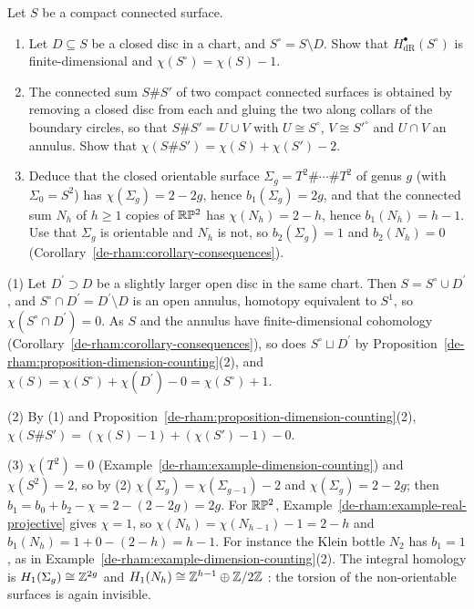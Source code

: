 \begin{exercise}\label{de-rham:exercise-genus-betti}
Let $S$ be a compact connected surface.
\begin{enumerate}
\item Let $D \subseteq S$ be a closed disc in a chart, and $S^\circ = S \setminus D$. Show that $H^\bullet_{\mathrm{dR}}(S^\circ)$ is finite-dimensional and $\chi(S^\circ) = \chi(S) - 1$.
\item The connected sum $S \# S'$ of two compact connected surfaces is obtained by removing a closed disc from each and gluing the two along collars of the boundary circles, so that $S \# S' = U \cup V$ with
$U \cong S^\circ$, $V \cong S'^\circ$ and $U \cap V$ an annulus. Show that $\chi(S \# S') = \chi(S) + \chi(S') - 2$.
\item Deduce that the closed orientable surface $\Sigma_g = T^2 \# \cdots \# T^2$ of genus $g$ (with $\Sigma_0 = S^2$) has $\chi(\Sigma_g) = 2 - 2g$, hence $b_1(\Sigma_g) = 2g$, and that the connected sum $N_h$ of
$h \geq 1$ copies of $\mathbb{R}\mathbb{P}^2$ has $\chi(N_h) = 2 - h$, hence $b_1(N_h) = h - 1$. Use that $\Sigma_g$ is orientable and $N_h$ is not, so $b_2(\Sigma_g) = 1$ and $b_2(N_h) = 0$
(Corollary~\ref{de-rham:corollary-consequences}).
\end{enumerate}
\end{exercise}

\begin{solution}
(1) Let $D^\prime \supset D$ be a slightly larger open disc in the same chart. Then $S = S^\circ \cup D^\prime$, and $S^\circ \cap D^\prime = D^\prime \setminus D$ is an open annulus, homotopy equivalent to $S^1$, so
$\chi(S^\circ \cap D^\prime) = 0$. As $S$ and the annulus have finite-dimensional cohomology (Corollary~\ref{de-rham:corollary-consequences}), so does $S^\circ \sqcup D^\prime$ by
Proposition~\ref{de-rham:proposition-dimension-counting}(2), and $\chi(S) = \chi(S^\circ) + \chi(D^\prime) - 0 = \chi(S^\circ) + 1$.

(2) By (1) and Proposition~\ref{de-rham:proposition-dimension-counting}(2), $\chi(S \# S') = (\chi(S) - 1) + (\chi(S') - 1) - 0$.

(3) $\chi(T^2) = 0$ (Example~\ref{de-rham:example-dimension-counting}) and $\chi(S^2) = 2$, so by (2) $\chi(\Sigma_g) = \chi(\Sigma_{g-1}) - 2$ and $\chi(\Sigma_g) = 2 - 2g$; then
$b_1 = b_0 + b_2 - \chi = 2 - (2 - 2g) = 2g$. For $\mathbb{R}\mathbb{P}^2$, Example~\ref{de-rham:example-real-projective} gives $\chi = 1$, so $\chi(N_h) = \chi(N_{h-1}) - 1 = 2 - h$ and $b_1(N_h) = 1 + 0 - (2 - h) = h - 1$. For instance the Klein bottle
$N_2$ has $b_1 = 1$, as in Example~\ref{de-rham:example-dimension-counting}(2). The integral homology is $H_1(\Sigma_g) \cong \mathbb{Z}^{2g}$ and $H_1(N_h) \cong \mathbb{Z}^{h-1} \oplus \mathbb{Z}/2\mathbb{Z}$ \cite{hatcher-at}: the torsion of the
non-orientable surfaces is again invisible.
\end{solution}

